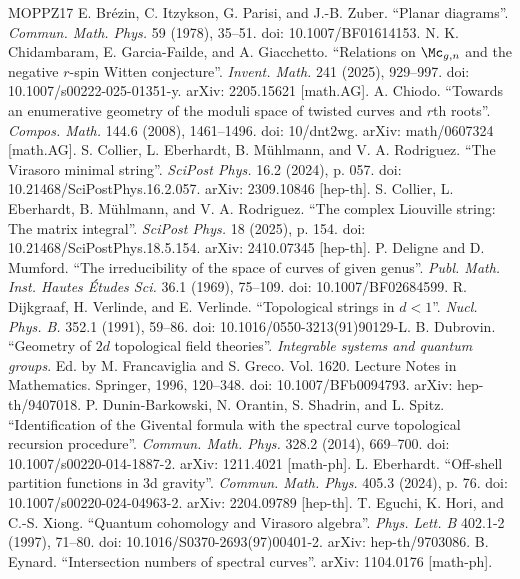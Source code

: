 \begin{thebibliography}{MOPPZ17}
 E. Br\'ezin, C. Itzykson, G. Parisi, and J.-B. Zuber. ``Planar diagrams''. \emph{Commun. Math. Phys.} 59 (1978), 35--51. doi: 10.1007/BF01614153.
 N. K. Chidambaram, E. Garcia-Failde, and A. Giacchetto. ``Relations on $\Mc_{g,n}$ and the negative $r$-spin Witten conjecture''. \emph{Invent. Math.} 241 (2025), 929--997. doi: 10.1007/s00222-025-01351-y. arXiv: 2205.15621 [math.AG].
 A. Chiodo. ``Towards an enumerative geometry of the moduli space of twisted curves and $r$th roots''. \emph{Compos. Math.} 144.6 (2008), 1461--1496. doi: 10/dnt2wg. arXiv: math/0607324 [math.AG].
 S. Collier, L. Eberhardt, B. M\"uhlmann, and V. A. Rodriguez. ``The Virasoro minimal string''. \emph{SciPost Phys.} 16.2 (2024), p. 057. doi: 10.21468/SciPostPhys.16.2.057. arXiv: 2309.10846 [hep-th].
 S. Collier, L. Eberhardt, B. M\"uhlmann, and V. A. Rodriguez. ``The complex Liouville string: The matrix integral''. \emph{SciPost Phys.} 18 (2025), p. 154. doi: 10.21468/SciPostPhys.18.5.154. arXiv: 2410.07345 [hep-th].
 P. Deligne and D. Mumford. ``The irreducibility of the space of curves of given genus''. \emph{Publ. Math. Inst. Hautes \'Etudes Sci.} 36.1 (1969), 75--109. doi: 10.1007/BF02684599.
 R. Dijkgraaf, H. Verlinde, and E. Verlinde. ``Topological strings in $d<1$''. \emph{Nucl. Phys. B.} 352.1 (1991), 59--86. doi: 10.1016/0550-3213(91)90129-L.
 B. Dubrovin. ``Geometry of $2d$ topological field theories''. \emph{Integrable systems and quantum groups}. Ed. by M. Francaviglia and S. Greco. Vol. 1620. Lecture Notes in Mathematics. Springer, 1996, 120--348. doi: 10.1007/BFb0094793. arXiv: hep-th/9407018.
 P. Dunin-Barkowski, N. Orantin, S. Shadrin, and L. Spitz. ``Identification of the Givental formula with the spectral curve topological recursion procedure''. \emph{Commun. Math. Phys.} 328.2 (2014), 669--700. doi: 10.1007/s00220-014-1887-2. arXiv: 1211.4021 [math-ph].
 L. Eberhardt. ``Off-shell partition functions in 3d gravity''. \emph{Commun. Math. Phys.} 405.3 (2024), p. 76. doi: 10.1007/s00220-024-04963-2. arXiv: 2204.09789 [hep-th].
 T. Eguchi, K. Hori, and C.-S. Xiong. ``Quantum cohomology and Virasoro algebra''. \emph{Phys. Lett. B} 402.1-2 (1997), 71--80. doi: 10.1016/S0370-2693(97)00401-2. arXiv: hep-th/9703086.
 B. Eynard. ``Intersection numbers of spectral curves''. arXiv: 1104.0176 [math-ph].

\end{thebibliography}
